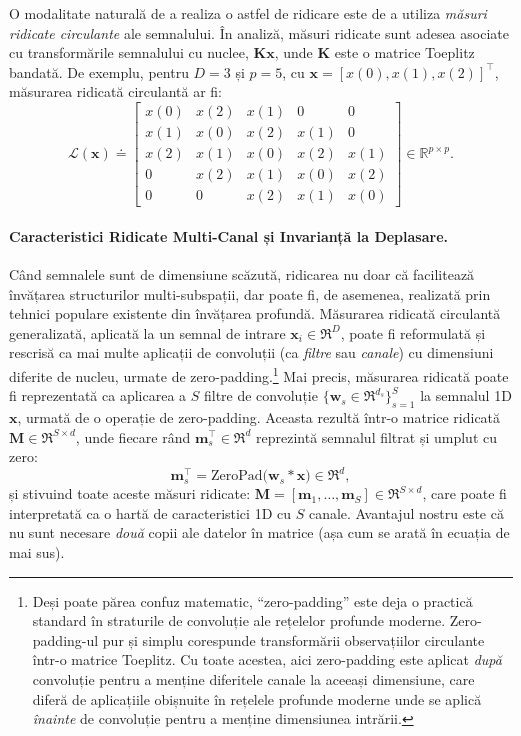 \documentclass[../../book-main_ro.tex]{subfiles}
\begin{document}
O modalitate naturală de a realiza o astfel de ridicare este de a utiliza {\em măsuri ridicate circulante} ale semnalului. În analiză, măsuri ridicate sunt adesea asociate cu transformările semnalului cu nuclee, $\bm K \bm x$, unde $\bm K$ este o matrice Toeplitz bandată. De exemplu, pentru $D=3$ și $p=5$, cu $\bm x = [x(0), x(1), x(2)]^\top$, măsurarea ridicată circulantă ar fi:
\begin{equation}
    \mathcal{L}(\bm x) \doteq
    \begin{bmatrix}
        x(0) & x(2) & x(1) & 0 & 0\\
        x(1) & x(0) & x(2) & x(1) & 0\\
        x(2) & x(1) & x(0) & x(2) & x(1)\\
        0 & x(2) & x(1) & x(0) & x(2)\\
        0 & 0 & x(2) & x(1) & x(0)
    \end{bmatrix}
    \in \mathbb{R}^{p \times p}.
\end{equation}

\paragraph{Caracteristici Ridicate Multi-Canal și Invarianță la Deplasare.} 
Când semnalele sunt de dimensiune scăzută, ridicarea nu doar că facilitează învățarea structurilor multi-subspații, dar poate fi, de asemenea, realizată prin tehnici populare existente din învățarea profundă. Măsurarea ridicată circulantă generalizată, aplicată la un semnal de intrare $\bm x_i \in \Re^D$, poate fi reformulată și rescrisă ca mai multe aplicații de convoluții (ca \textit{filtre} sau \textit{canale}) cu dimensiuni diferite de nucleu, urmate de zero-padding.\footnote{Deși poate părea confuz matematic, ``zero-padding'' este deja o practică standard în straturile de convoluție ale rețelelor profunde moderne. Zero-padding-ul pur și simplu corespunde transformării observațiilor circulante într-o matrice Toeplitz. Cu toate acestea, aici zero-padding este aplicat \textit{după} convoluție pentru a menține diferitele canale la aceeași dimensiune, care diferă de aplicațiile obișnuite în rețelele profunde moderne \citep{he2016deep} unde se aplică \textit{înainte} de convoluție pentru a menține dimensiunea intrării.} Mai precis, măsurarea ridicată poate fi reprezentată ca aplicarea a $S$ filtre de convoluție $\{\bm{w}_s \in \Re^{d_s}\}_{s=1}^S$ la semnalul 1D $\bm x$, urmată de o operație de zero-padding. Aceasta rezultă într-o matrice ridicată $\bm M \in \Re^{S \times d}$, unde fiecare rând $\bm{m}_s^\top \in \Re^{d}$ reprezintă semnalul filtrat și umplut cu zero:
\begin{equation}
    \bm{m}_s^\top = \text{ZeroPad}\Big( \bm{w}_s * \bm{x} \Big) \in \Re^{d},
\end{equation}
și stivuind toate aceste măsuri ridicate: $\bm M = [\bm{m}_1, \ldots, \bm{m}_S ] \in \Re^{S \times d}$, care poate fi interpretată ca o hartă de caracteristici 1D cu $S$ canale. Avantajul nostru este că nu sunt necesare \textit{două} copii ale datelor în matrice (așa cum se arată în ecuația de mai sus).
\end{document}
